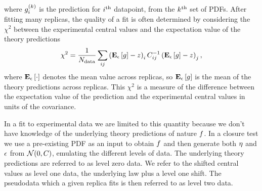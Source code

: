 where $g^{(k)}_i$ is the prediction for $i^{\rm th}$ datapoint, from
the $k^{\rm th}$ set of PDFs. After fitting many replicas, the quality of a fit
is often determined by considering the $\chi^2$ between the experimental central
values and the expectation value of the theory predictions
\begin{equation}\label{eq:centralchi2}
    \chi^2 = \frac{1}{N_{\rm data}} \sum_{ij} \left( \mathbf{E}_{\epsilon}\left[ g \right] - z \right)_i C^{-1}_{ij} \left( \mathbf{E}_{\epsilon}\left[ g \right] - z \right)_j,
\end{equation}
where $\mathbf{E}_{\epsilon}\left[ \cdot \right]$ denotes the mean value across replicas, so $\mathbf{E}_{\epsilon}\left[ g \right]$ is
the mean of the theory predictions across replicas. This $\chi^2$ is a measure
of the difference between the expectation value of the prediction and the
experimental central values in units of the covariance.

In a fit to experimental data we are limited to this quantity because we don't
have knowledge of the underlying theory predictions of nature $f$. In a
closure test we use a pre-existing PDF as an input to obtain $f$ and then
generate both $\eta$ and $\epsilon$ from $\mathcal{N}(0, C)$, emulating the
different levels of data. The underlying theory predictions are referred to as
level zero data. We refer to the shifted central values as level one data, the
underlying law plus a level one shift. The pseudodata which a given replica fits
is then referred to as level two data.
